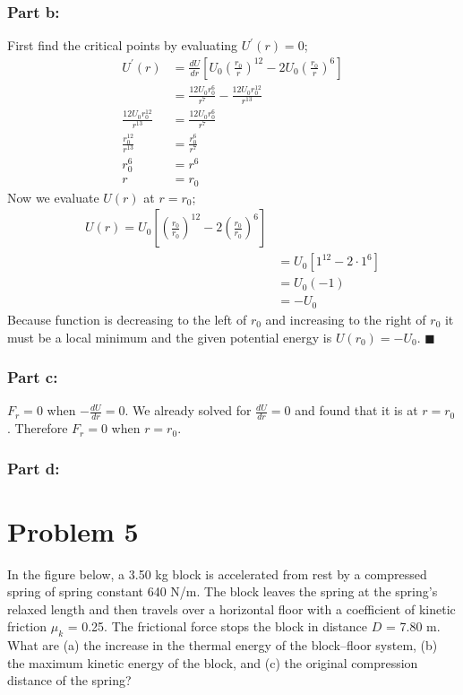 \documentclass{article}
\begin{document}
\subsubsection*{Part b:}
First find the critical points by evaluating $U^\prime(r) = 0$;
\begin{align*}
	U^\prime (r) &= \frac{dU}{dr} \left[ U_0\left( \frac{r_0}{r} \right)^{12} - 2 U_0\left( \frac{r_0}{r}\right)^6 \right] \\
		     &= \frac{12U_{0} r_{0}^{6}}{r^{7}} - \frac{12U_{0} r_{0}^{12}}{r^{13}} \\
	\frac{12U_{0} r_{0}^{12}}{r^{13}} &= \frac{12U_{0} r_{0}^{6}}{r^{7}} \\
	\frac{r_0^{12}}{r^{13}} &= \frac{r_0^6}{r^7} \\
	r_0^6 &= r^6 \\
	r &= r_0
\end{align*}
Now we evaluate $U(r)$ at $r = r_0$;
\begin{align*}
	U(r) = U_0 \left[ \left( \frac{r_0}{r_0} \right)^{12} - 2 \left( \frac{r_0}{r_0}\right)^6 \right] \\
	&= U_0 \left[ 1^12 - 2 \cdot 1^6 \right] \\
	&= U_0 (-1) \\
	&= -U_0
\end{align*}
Because function is decreasing to the left of $r_0$ and increasing to the right of $r_0$ it must be a local minimum and the given potential energy is $U(r_0) = -U_0$. $\blacksquare$

\subsubsection*{Part c:}
$F_r = 0$ when $-\frac{dU}{dr} = 0$. We already solved for $\frac{dU}{dr} = 0$ and found that it is at $r = r_0$. Therefore $F_r = 0$ when $r = r_0$.

\subsubsection*{Part d:}


\section*{Problem 5}
In the figure below, a 3.50 kg block is accelerated from rest by a compressed spring of spring constant 640
N/m. The block leaves the spring at the spring’s relaxed length and then travels over a horizontal floor with a
coefficient of kinetic friction $\mu_k$ = 0.25. The frictional force stops the block in distance $D$ = 7.80 m. What are
(a) the increase in the thermal energy of the block–floor system, (b) the maximum kinetic energy of the block,
and (c) the original compression distance of the spring?
\end{document}
